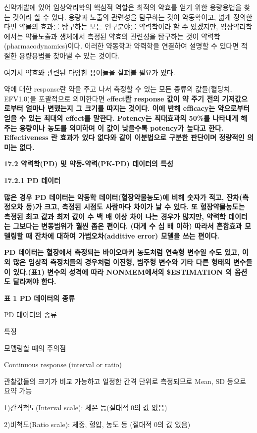 \documentclass[
  10pt,
]{krantz}
\begin{document}
신약개발에 있어 임상약리학의 핵심적 역할은 최적의 약효를 얻기 위한 용량용법을 찾는 것이라 할 수 있다. 용량과 노출의 관련성을
탐구하는 것이 약동학이고, 넓게 정의한다면 약물의 효과를 탐구하는 모든 연구분야를 약력학이라 할 수 있겠지만, 임상약리학에서는
약물노출과 생체에서 측정된 약효의 관련성을 탐구하는 것이 약력학(pharmacodynamics)이다. 이러한 약동학과 약력학을
연결하여 설명할 수 있다면 적절한 용량용법을 찾아낼 수 있는 것이다.

여기서 약효와 관련된 다양한 용어들을 살펴볼 필요가 있다.

약에 대한 response란 약을 주고 나서 측정할 수 있는 모든 종류의 값들(혈당치, EFV1.0)을 포괄적으로 의미한다면
e\textbf{ffect란 response 값이 약 주기 전의 기저값으로부터 얼마나 변했는지 그 크기를 따지는 것이다. 이에 반해
efficacy는 약으로부터 얻을 수 있는 최대의 effect를 말한다. Potency는 최대효과의 50\%를 나타내게 해 주는
용량이나 농도를 의미하며 이 값이 낮을수록 potency가 높다고 한다. Effectiveness 란 효과가 있다 없다와
같이 이분법으로 구분한 판단이며 정량적인 의미는 없다.}

\textbf{17.2 약력학(PD) 및 약동-약력(PK-PD) 데이터의 특성}

\textbf{17.2.1 PD 데이터}

\textbf{많은 경우 PD 데이터는 약동학 데이터(혈장약물농도)에 비해 숫자가 적고, 잔차(측정오차 등)가 크고, 측정된 시점도 사람마다
차이가 날 수 있다. 또 혈장약물농도는 측정된 최고 값과 최저 값이 수 백 배 이상 차이 나는 경우가 많지만, 약력학 데이터는
그보다는 변동범위가 훨씬 좁은 편이다. (대게 수 십 배 이하) 따라서 혼합효과 모델링할 때 잔차에 대하여
가법오차(additive error) 모델을 쓰는 편이다.}

\textbf{PD 데이터는 혈장에서 측정되는 바이오마커 농도처럼 연속형 변수일 수도 있고, 이외 많은 임상적 측정치들의 경우처럼 이진형,
범주형 변수와 기타 다른 형태의 변수들이 있다.(표1) 변수의 성격에 따라 NONMEM에서의 \$ESTIMATION 의 옵션도
달라져야 한다.}

\textbf{표 1 PD 데이터의 종류}

PD 데이터의 종류

특징

모델링할 때의 주의점

Continuous response (interval or ratio)

관찰값들의 크기가 비교 가능하고 일정한 간격 단위로 측정되므로 Mean, SD 등으로 요약 가능

1)간격척도(Interval scale): 체온 등(절대적 0의 값 없음)

2)비척도(Ratio scale): 체중, 혈압, 농도 등 (절대적 0의 값 있음)
\end{document}
